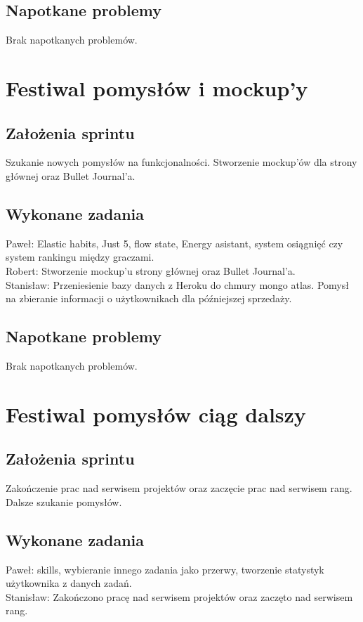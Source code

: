 \documentclass[a4paper,11pt]{report}
\begin{document}
\subsection {Napotkane problemy}
Brak napotkanych problemów.

\section {Festiwal pomysłów i mockup'y}
\subsection {Założenia sprintu}
Szukanie nowych pomysłów na funkcjonalności. Stworzenie mockup'ów dla strony głównej oraz Bullet Journal'a. 
\subsection {Wykonane zadania}
Paweł: Elastic habits, Just 5, flow state, Energy asistant, system osiągnięć czy system rankingu między graczami.\\
Robert: Stworzenie mockup'u strony głównej oraz Bullet Journal'a.\\
Stanisław: Przeniesienie bazy danych z Heroku do chmury mongo atlas. Pomysł na zbieranie informacji o użytkownikach dla późniejszej sprzedaży.\\
\subsection {Napotkane problemy}
Brak napotkanych problemów.

\section {Festiwal pomysłów ciąg dalszy}
\subsection {Założenia sprintu}
Zakończenie prac nad serwisem projektów oraz zaczęcie prac nad serwisem rang. Dalsze szukanie pomysłów.
\subsection {Wykonane zadania}
Paweł: skills, wybieranie innego zadania jako przerwy, tworzenie statystyk użytkownika z danych zadań.\\
Stanisław: Zakończono pracę nad serwisem projektów oraz zaczęto nad serwisem rang.\\
\end{document}
